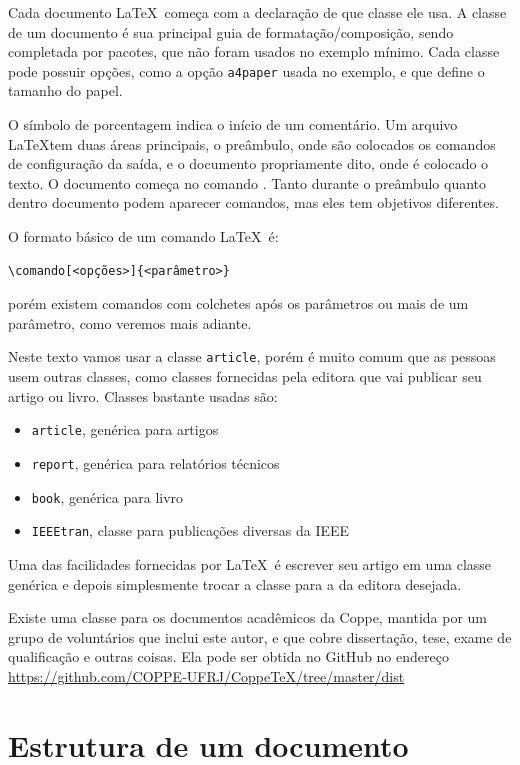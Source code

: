 Cada documento \LaTeX\ começa com a declaração de que classe ele usa. A classe de um documento é sua principal guia de formatação/composição, sendo completada por
pacotes, que não foram usados no exemplo mínimo. Cada classe pode possuir opções, como a opção \verb|a4paper| usada no exemplo, e que define o tamanho do papel.

O símbolo de porcentagem indica o início de um comentário. Um arquivo \LaTeX tem duas áreas principais, o preâmbulo, onde são colocados os comandos de configuração da saída, e o documento propriamente dito, onde é colocado o texto. O documento começa no comando \lstinline||. Tanto durante o preâmbulo quanto dentro documento podem aparecer comandos, mas eles tem objetivos diferentes.

O formato básico de um comando \LaTeX\ é:
\begin{verbatim}
\comando[<opções>]{<parâmetro>}
\end{verbatim}
porém existem comandos com colchetes após os parâmetros ou mais de um parâmetro, como veremos mais adiante.

Neste texto vamos usar a classe \texttt{article}, porém é muito comum que as pessoas usem outras classes, como classes fornecidas pela editora que vai
publicar seu artigo ou livro. Classes bastante usadas são:
\begin{itemize}
    \item \texttt{article}, genérica para artigos
    \item \texttt{report}, genérica para relatórios técnicos
    \item \texttt{book}, genérica para livro
    \item \texttt{IEEEtran}, classe para publicações diversas da IEEE
\end{itemize}

Uma das facilidades fornecidas por \LaTeX\ é escrever seu artigo em uma classe genérica e depois simplesmente trocar a classe para a da editora desejada.

 Existe uma classe para os documentos acadêmicos da Coppe, mantida por um grupo de voluntários que inclui este autor, e que cobre dissertação, tese, exame de qualificação e outras coisas. Ela pode ser obtida no GitHub no endereço
 \url{https://github.com/COPPE-UFRJ/CoppeTeX/tree/master/dist}

\section{Estrutura de um documento}

